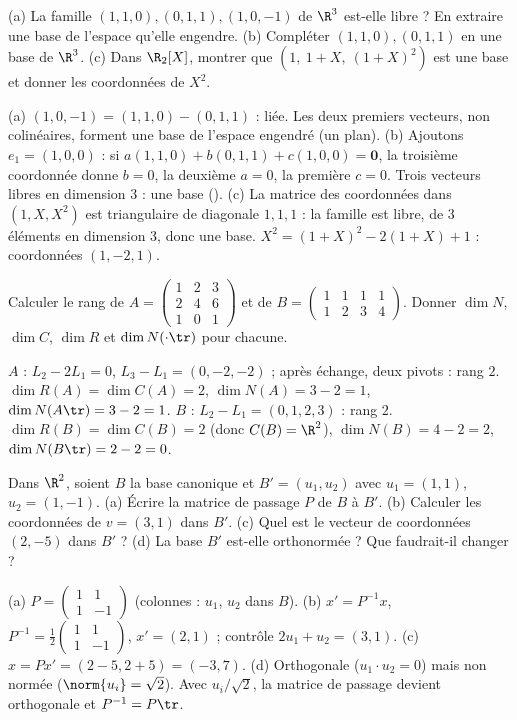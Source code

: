 \begin{exo}
(a) La famille $(1,1,0),(0,1,1),(1,0,-1)$ de $\R^3$ est-elle libre ? En extraire une base de l'espace qu'elle engendre.
(b) Compléter $(1,1,0),(0,1,1)$ en une base de $\R^3$.
(c) Dans $\R_2[X]$, montrer que $(1,\ 1+X,\ (1+X)^2)$ est une base et donner les coordonnées de $X^2$.
\begin{corrige}
(a) $(1,0,-1)=(1,1,0)-(0,1,1)$ : liée. Les deux premiers vecteurs, non colinéaires, forment une base de l'espace engendré (un plan).
(b) Ajoutons $e_1=(1,0,0)$ : si $a(1,1,0)+b(0,1,1)+c(1,0,0)=\mathbf 0$, la troisième coordonnée donne $b=0$, la deuxième $a=0$, la première $c=0$. Trois vecteurs libres en dimension 3 : une base ().
(c) La matrice des coordonnées dans $(1,X,X^2)$ est triangulaire de diagonale $1,1,1$ : la famille est libre, de 3 éléments en dimension 3, donc une base. $X^2=(1+X)^2-2(1+X)+1$ : coordonnées $(1,-2,1)$.
\end{corrige}
\end{exo}
\begin{exo}
Calculer le rang de $A=\begin{pmatrix}1&2&3\\2&4&6\\1&0&1\end{pmatrix}$ et de $B=\begin{pmatrix}1&1&1&1\\1&2&3&4\end{pmatrix}$. Donner $\dim N$, $\dim C$, $\dim R$ et $\dim N(\cdot\tr)$ pour chacune.
\begin{corrige}
$A$ : $L_2-2L_1=0$, $L_3-L_1=(0,-2,-2)$ ; après échange, deux pivots : rang $2$. $\dim R(A)=\dim C(A)=2$, $\dim N(A)=3-2=1$, $\dim N(A\tr)=3-2=1$. $B$ : $L_2-L_1=(0,1,2,3)$ : rang $2$. $\dim R(B)=\dim C(B)=2$ (donc $C(B)=\R^2$), $\dim N(B)=4-2=2$, $\dim N(B\tr)=2-2=0$.
\end{corrige}
\end{exo}
\begin{exo}
Dans $\R^2$, soient $B$ la base canonique et $B'=(u_1,u_2)$ avec $u_1=(1,1)$, $u_2=(1,-1)$. (a) Écrire la matrice de passage $P$ de $B$ à $B'$. (b) Calculer les coordonnées de $v=(3,1)$ dans $B'$. (c) Quel est le vecteur de coordonnées $(2,-5)$ dans $B'$ ? (d) La base $B'$ est-elle orthonormée ? Que faudrait-il changer ?
\begin{corrige}
(a) $P=\begin{pmatrix}1&1\\1&-1\end{pmatrix}$ (colonnes : $u_1$, $u_2$ dans $B$). (b) $x'=P^{-1}x$, $P^{-1}=\frac12\begin{pmatrix}1&1\\1&-1\end{pmatrix}$, $x'=(2,1)$ ; contrôle $2u_1+u_2=(3,1)$. (c) $x=Px'=(2-5,2+5)=(-3,7)$. (d) Orthogonale ($u_1\cdot u_2=0$) mais non normée ($\norm{u_i}=\sqrt2$). Avec $u_i/\sqrt2$, la matrice de passage devient orthogonale et $P^{-1}=P\tr$.
\end{corrige}
\end{exo}
